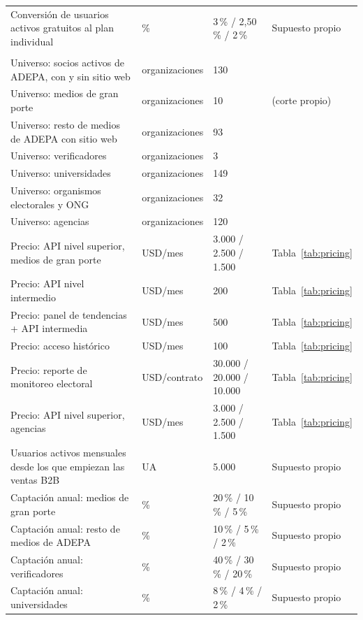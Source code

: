 {\begin{longtable}{@{}>{\raggedright\arraybackslash}p{5.2cm} p{2.1cm} p{2.4cm} >{\raggedright\arraybackslash}p{4.1cm}@{}}
    Conversión de usuarios activos gratuitos al plan individual & \% & 3\,\% / 2,50\,\% / 2\,\% & Supuesto propio \\
    \multicolumn{4}{@{}l}{\textit{Clientes B2B}} \\
    Universo: socios activos de ADEPA, con y sin sitio web & organizaciones & 130 & \parencite{ADEPA2026} \\
    Universo: medios de gran porte & organizaciones & 10 & \parencite{ADEPA2026} (corte propio) \\
    Universo: resto de medios de ADEPA con sitio web & organizaciones & 93 & \parencite{ADEPA2026} \\
    Universo: verificadores & organizaciones & 3 & \parencite{LatamChequea2026} \\
    Universo: universidades & organizaciones & 149 & \parencite{SubsecretariaPoliticasUniversitarias2026} \\
    Universo: organismos electorales y ONG & organizaciones & 32 & \parencite{MinisterioInterior2026} \\
    Universo: agencias & organizaciones & 120 & \parencite{AgenciasArgentinas2026} \\
    Precio: API nivel superior, medios de gran porte & USD/mes & 3.000 / 2.500 / 1.500 & Tabla~\ref{tab:pricing} \\
    Precio: API nivel intermedio & USD/mes & 200 & Tabla~\ref{tab:pricing} \\
    Precio: panel de tendencias + API intermedia & USD/mes & 500 & Tabla~\ref{tab:pricing} \\
    Precio: acceso histórico & USD/mes & 100 & Tabla~\ref{tab:pricing} \\
    Precio: reporte de monitoreo electoral & USD/contrato & 30.000 / 20.000 / 10.000 & Tabla~\ref{tab:pricing} \\
    Precio: API nivel superior, agencias & USD/mes & 3.000 / 2.500 / 1.500 & Tabla~\ref{tab:pricing} \\
    Usuarios activos mensuales desde los que empiezan las ventas B2B & UA & 5.000 & Supuesto propio \\
    Captación anual: medios de gran porte & \% & 20\,\% / 10\,\% / 5\,\% & Supuesto propio \\
    Captación anual: resto de medios de ADEPA & \% & 10\,\% / 5\,\% / 2\,\% & Supuesto propio \\
    Captación anual: verificadores & \% & 40\,\% / 30\,\% / 20\,\% & Supuesto propio \\
    Captación anual: universidades & \% & 8\,\% / 4\,\% / 2\,\% & Supuesto propio \\

\end{longtable}}
